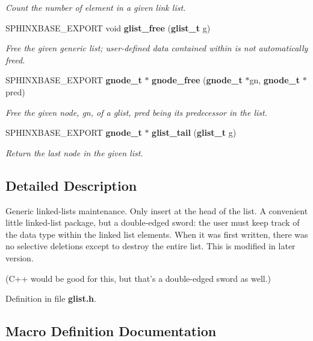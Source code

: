 \begin{DoxyCompactItemize}
\begin{DoxyCompactList}\small\item\em Count the number of element in a given link list. \end{DoxyCompactList}\item 
S\-P\-H\-I\-N\-X\-B\-A\-S\-E\-\_\-\-E\-X\-P\-O\-R\-T void {\bf glist\-\_\-free} ({\bf glist\-\_\-t} g)
\begin{DoxyCompactList}\small\item\em Free the given generic list; user-\/defined data contained within is not automatically freed. \end{DoxyCompactList}\item 
S\-P\-H\-I\-N\-X\-B\-A\-S\-E\-\_\-\-E\-X\-P\-O\-R\-T {\bf gnode\-\_\-t} $\ast$ {\bf gnode\-\_\-free} ({\bf gnode\-\_\-t} $\ast$gn, {\bf gnode\-\_\-t} $\ast$pred)
\begin{DoxyCompactList}\small\item\em Free the given node, gn, of a glist, pred being its predecessor in the list. \end{DoxyCompactList}\item 
S\-P\-H\-I\-N\-X\-B\-A\-S\-E\-\_\-\-E\-X\-P\-O\-R\-T {\bf gnode\-\_\-t} $\ast$ {\bf glist\-\_\-tail} ({\bf glist\-\_\-t} g)\label{glist_8h_a6921d6b8b11cb9e05fadeaa091e89234}

\begin{DoxyCompactList}\small\item\em Return the last node in the given list. \end{DoxyCompactList}\end{DoxyCompactItemize}


\subsection{Detailed Description}
Generic linked-\/lists maintenance. Only insert at the head of the list. A convenient little linked-\/list package, but a double-\/edged sword\-: the user must keep track of the data type within the linked list elements. When it was first written, there was no selective deletions except to destroy the entire list. This is modified in later version.

(C++ would be good for this, but that's a double-\/edged sword as well.) 

Definition in file {\bf glist.\-h}.



\subsection{Macro Definition Documentation}
